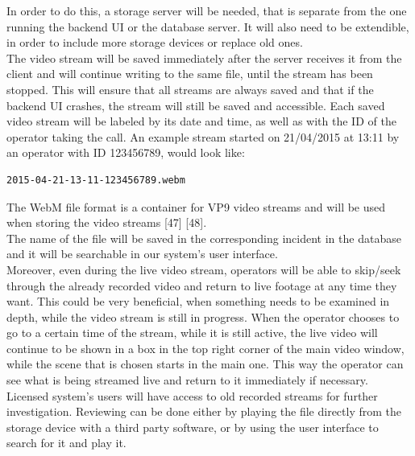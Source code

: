 \documentclass{article}
\begin{document}
In order to do this, a storage server will be needed, that is separate from the one running the backend UI or the database server. It will also need to be extendible, in order to include more storage devices or replace old ones.\\

The video stream will be saved immediately after the server receives it from the client and will continue writing to the same file, until the stream has been stopped. This will ensure that all streams are always saved and that if the backend UI crashes, the stream will still be saved and accessible. Each saved video stream will be labeled by its date and time, as well as with the ID of the operator taking the call. An example stream started on 21/04/2015 at 13:11 by an operator with ID 123456789, would look like:
\begin{lstlisting}
2015-04-21-13-11-123456789.webm
\end{lstlisting}
The WebM file format is a container for VP9 video streams and will be used when storing the video streams [47] [48].\\

The name of the file will be saved in the corresponding incident in the database and it will be searchable in our system’s user interface. \\

Moreover, even during the live video stream, operators will be able to skip/seek through the already recorded video and return to live footage at any time they want. This could be very beneficial, when something needs to be examined in depth, while the video stream is still in progress. When the operator chooses to go to a certain time of the stream, while it is still active, the live video will continue to be shown in a box in the top right corner of the main video window, while the scene that is chosen starts in the main one. This way the operator can see what is being streamed live and return to it immediately if necessary.\\

Licensed system’s users will have access to old recorded streams for further investigation. Reviewing can be done either by playing the file directly from the storage device with a third party software, or by using the user interface to search for it and play it.\\
			
\end{document}
